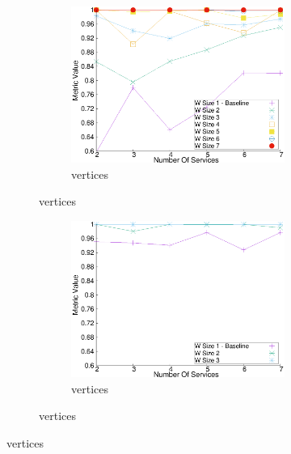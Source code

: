 \begin{figure}[H]
\begin{adjustbox}{minipage=\linewidth,scale=0.75}
\begin{subfigure}{0.45\textwidth}
          \begin{subfigure}{\textwidth}
            \includegraphics[width=\textwidth]{Images/graphs/window_quality_performance_diff_perce_n7_s7_20_100_n7}
            \caption{ vertices}
            \label{fig:quality_window_wide_perce_n7}
          \end{subfigure}
        \end{subfigure}
        \begin{subfigure}{0.45\textwidth}
          \begin{subfigure}{\textwidth}
            \includegraphics[width=\textwidth]{Images/graphs/window_quality_performance_diff_perce_n7_s7_50_89_n3}
            \caption{ vertices}

            \label{fig:quality_window_average_perce_n3}
          \end{subfigure}


\end{subfigure}
\end{adjustbox}
\end{figure}

